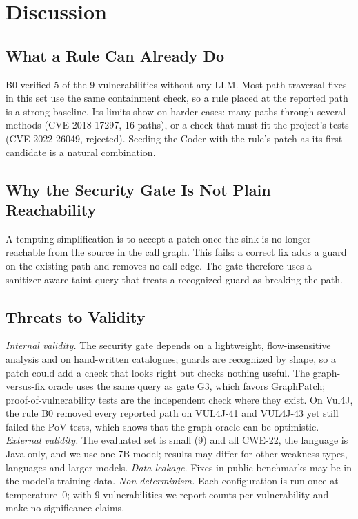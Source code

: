 \documentclass[conference]{IEEEtran}
\begin{document}
\section{Discussion}

\subsection{What a Rule Can Already Do}
B0 verified 5 of the 9 vulnerabilities without any LLM. Most path-traversal fixes in
this set use the same containment check, so a rule placed at the reported path is a
strong baseline. Its limits show on harder cases: many paths through several methods
(CVE-2018-17297, 16 paths), or a check that must fit the project's tests
(CVE-2022-26049, rejected). Seeding the Coder with the rule's patch as its first
candidate is a natural combination.

\subsection{Why the Security Gate Is Not Plain Reachability}
A tempting simplification is to accept a patch once the sink is no longer reachable
from the source in the call graph. This fails: a correct fix adds a guard on the
existing path and removes no call edge. The gate therefore uses a sanitizer-aware taint
query that treats a recognized guard as breaking the path.

\subsection{Threats to Validity}
\emph{Internal validity.} The security gate depends on a lightweight, flow-insensitive
analysis and on hand-written catalogues; guards are recognized by shape, so a patch could
add a check that looks right but checks nothing useful. The graph-versus-fix oracle uses
the same query as gate G3, which favors GraphPatch; proof-of-vulnerability tests are the
independent check where they exist. On Vul4J, the rule B0 removed every reported path on
VUL4J-41 and VUL4J-43 yet still failed the PoV tests, which shows that the graph oracle
can be optimistic. \emph{External validity.} The evaluated set is small (9) and all
CWE-22, the language is Java only, and we use one 7B model; results may differ for
other weakness types, languages and larger models. \emph{Data leakage.} Fixes in public
benchmarks may be in the model's training data. \emph{Non-determinism.} Each
configuration is run once at temperature~0; with 9 vulnerabilities we report counts per
vulnerability and make no significance claims.
\end{document}
